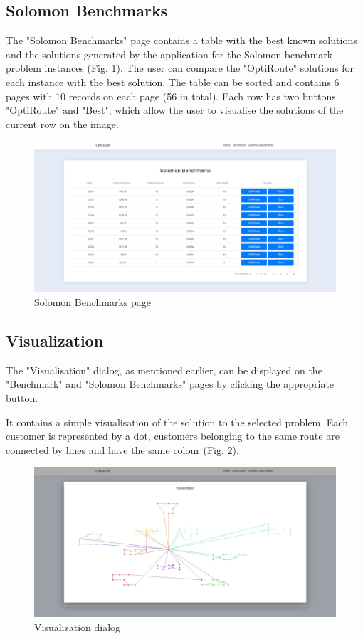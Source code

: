 \documentclass[a4paper,twoside,12pt]{book}
\begin{document}
\subsection{Solomon Benchmarks}

The "Solomon Benchmarks" page contains a table with the best known solutions and the solutions generated by the application for the Solomon benchmark problem instances (Fig. \ref{fig:solomonBenchmark}). The user can compare the "OptiRoute" solutions for each instance with the best solution. The table can be sorted and contains 6 pages with 10 records on each page (56 in total). Each row has two buttons "OptiRoute" and "Best", which allow the user to visualise the solutions of the current row on the image.

\begin{figure}[H]
\centering
\includegraphics[width=\textwidth]{images/solomonBenchmark.jpg}
\caption{Solomon Benchmarks page}
\label{fig:solomonBenchmark}
\end{figure}

\subsection{Visualization}

The "Visualisation" dialog, as mentioned earlier, can be displayed on the "Benchmark" and "Solomon Benchmarks" pages by clicking the appropriate button. 

It contains a simple visualisation of the solution to the selected problem. Each customer is represented by a dot, customers belonging to the same route are connected by lines and have the same colour (Fig. \ref{fig:visualization}).

\begin{figure}[H]
\centering
\includegraphics[width=\textwidth]{images/visualization.jpg}
\caption{Visualization dialog}
\label{fig:visualization}
\end{figure}
\end{document}
